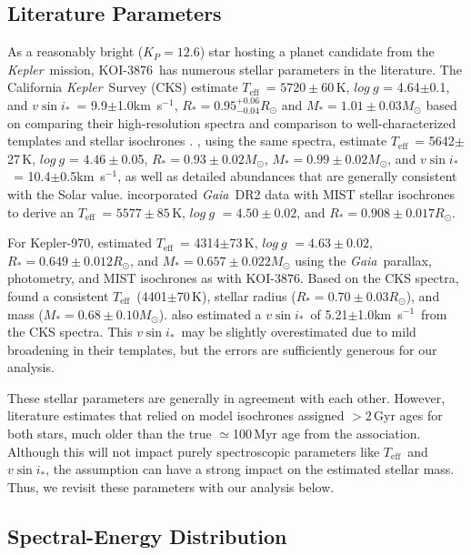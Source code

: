 \documentclass[twocolumn, linenumbers]{aastex631}
\newcommand{\starname}{KOI-3876}
\newcommand{\starnametwo}{Kepler-970}
\newcommand{\vsini}{$v\sin{i_*}$}
\newcommand{\kepler}{{\it Kepler}}
\newcommand{\logg}{$log~g$ }
\newcommand{\teff}{\ensuremath{T_{\text{eff}}}}
\newcommand\kms{km~s$^{-1}$}
\newcommand{\gaia}{\textit{Gaia}}
\begin{document}
\subsection{Literature Parameters}
As a reasonably bright ($K_P=12.6$) star hosting a planet candidate from the \kepler\ mission, \starname\ has numerous stellar parameters in the literature. The California \kepler\ Survey (CKS) estimate \teff\ = $5720\pm60$\,K, \logg = 4.64$\pm$0.1, and \vsini\ = 9.9$\pm$1.0\kms, $R_*=0.95^{+0.06}_{-0.04}R_\odot$ and $M_*=1.01\pm0.03M_\odot$ based on comparing their high-resolution spectra and comparison to well-characterized templates \citep{2017ApJ...836...77Y, 2017AJ....154..107P} and stellar isochrones \citep{JohsonCKS2017}. \citet{2018ApJS..237...38B}, using the same spectra, estimate \teff\ = 5642$\pm$27\,K, \logg = $4.46\pm$0.05, $R_*=0.93\pm0.02M_\odot$, $M_*=0.99\pm0.02M_\odot$, and \vsini\ = 10.4$\pm$0.5\kms, as well as detailed abundances that are generally consistent with the Solar value. \citet{2020AJ....159..280B} incorporated \gaia\ DR2 data with MIST stellar isochrones to derive an \teff\ = $5577\pm85$\,K, \logg $=4.50\pm0.02$, and $R_*=0.908\pm0.017R_\odot$. 

For \starnametwo, \citet{2020AJ....159..280B} estimated \teff\ = 4314$\pm$73\,K, \logg$=4.63\pm0.02$, $R_*=0.649\pm0.012R_\odot$, and $M_*=0.657\pm0.022M_\odot$ using the \gaia\ parallax, photometry, and MIST isochrones as with \starname. Based on the CKS spectra, \citet{CKS_cool} found a consistent \teff\ (4401$\pm$70\,K), stellar radius ($R_*=0.70\pm0.03R_\odot$), and mass ($M_*=0.68\pm0.10M_\odot$). \citet{CKS_cool} also estimated a \vsini\ of 5.21$\pm$1.0\kms\ from the CKS spectra. This \vsini\ may be slightly overestimated due to mild broadening in their templates, but the errors are sufficiently generous for our analysis. 

These stellar parameters are generally in agreement with each other. However, literature estimates that relied on model isochrones \citep[e.g.,][]{2020AJ....159..280B} assigned $>2$\,Gyr ages for both stars, much older than the true $\simeq$100\,Myr age from the association. Although this will not impact purely spectroscopic parameters like \teff\ and \vsini, the assumption can have a strong impact on the estimated stellar mass. Thus, we revisit these parameters with our analysis below. 


\subsection{Spectral-Energy Distribution}\label{sec:sed}
\end{document}
